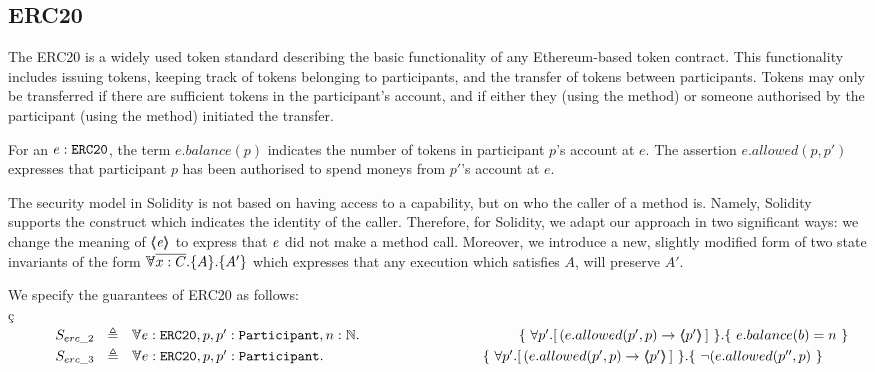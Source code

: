 \subsection{ERC20}

The ERC20 \cite{ERC20} is a widely used token standard describing the basic functionality of any Ethereum-based token 
contract. 
This functionality includes issuing tokens, keeping track of tokens belonging to participants, and the 
transfer of tokens between participants. Tokens may only be transferred if there are sufficient tokens in the 
participant's account, and if either they (using the  method) or someone authorised by the participant (using the  method) initiated the transfer. 

For an $e:\mbox{\normalfont{\texttt{ERC20}}}$, the term $e.balance(p)$  indicates the number of tokens in   participant $p$'s  account at $e$.
The 
assertion $e.allowed(p,p')$ expresses that participant $p$ has been authorised to spend moneys from $p'$'s account at $e$.
 
The security model in Solidity is not based on having access to a capability, but on who the caller of a method is. 
Namely, Solidity supports the  construct  which indicates the identity of the caller.
Therefore, for Solidity, we adapt our approach in two significant ways:
we change the meaning of $\langle\!\!\langle \mathit{e} \rangle\!\!\rangle$ to express that $\mathit{e}$ did not make a method call.
Moreover, we introduce a new, slightly modified form of two state invariants of the form $\TwoStates{\overline {x:C}}{A}{A'}$ which expresses that any execution which satisfies $A$, will preserve $A'$.


We specify the guarantees of   ERC20  as follows:
\\
ç
\\
$\strut \SPSP  S_{erc\_2}\ \  \triangleq \ \ \TwoStatesLB{ e:\prg{ERC20},p,p':\prg{Participant},n:\mathbb{N}} 
 {\ \forall p'.[\,(e.allowed(p',p) \rightarrow   \inside{p'}\, ] \ } { \ e.balance(b)=n \ } $ 
\\
$\strut \SPSP  S_{erc\_3}\ \  \triangleq \ \ \TwoStatesLB{ e:\prg{ERC20},p,p':\prg{Participant}}  {\ \forall p'.[\,(e.allowed(p',p) \rightarrow   \inside{p'}\, ] \ } { \ \neg (e.allowed(p'',p) \ } $ 

